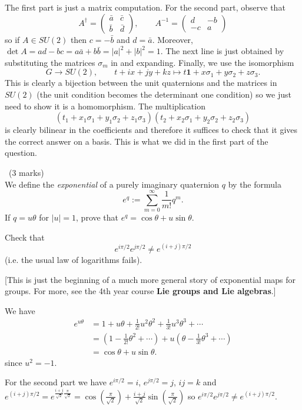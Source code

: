 \documentclass[12pt]{article}
\begin{document}
\begin{answer}
  The first part is just a matrix computation. For the second part, observe that
  \[A^{\dagger}=\left(\begin{array}{cc}\bar{a} & \bar{c}\\\bar{b} & \bar{d}\end{array}\right),\qquad A^{-1}=\left(\begin{array}{cc}d & -b\\-c & a\end{array}\right)\]
    so if $A\in SU(2)$ then $c=-\bar{b}$ and $d=\bar{a}$. Moreover, $\det A=ad-bc=a\bar{a}+b\bar{b}=|a|^2+|b|^2=1$. The next line is just obtained by substituting the matrices $\sigma_m$ in and expanding. Finally, we use the isomorphism
    \[G\to SU(2),\qquad t+ix+jy+kz\mapsto t\mathbf{1}+x\sigma_1+y\sigma_2+z\sigma_3.\]
    This is clearly a bijection between the unit quaternions and the matrices in $SU(2)$ (the unit condition becomes the determinant one condition) so we just need to show it is a homomorphism. The multiplication
    \[\left(t_1+x_1\sigma_1+y_1\sigma_2+z_1\sigma_3\right)\left(t_2+x_2\sigma_1+y_2\sigma_2+z_2\sigma_3\right)\]
    is clearly bilinear in the coefficients and therefore it suffices to check that it gives the correct answer on a basis. This is what we did in the first part of the question.
\end{answer}
\newpage

\vspace{1cm}

\begin{question}\ (3 marks)\\
  We define the {\em exponential} of a purely imaginary quaternion $q$ by the formula
  \[e^q:=\sum_{m=0}^\infty\frac{1}{m!}q^m.\]
  If $q=u\theta$ for $|u|=1$, prove that $e^q=\cos\theta+u\sin\theta$.

  Check that
  \[e^{i\pi/2}e^{j\pi/2}\neq e^{(i+j)\pi/2}\]
  (i.e. the usual law of logarithms fails).
  
  [This is just the beginning of a much more general story of exponential maps for groups. For more, see the 4th year course {\bf Lie groups and Lie algebras}.]
\end{question}

\begin{answer}
  We have
  \begin{align*}
    e^{u\theta}&=1+u\theta+\frac{1}{2!}u^2\theta^2+\frac{1}{3!}u^3\theta^3+\cdots\\
    &=\left(1-\frac{1}{2!}\theta^2+\cdots\right)+u\left(\theta-\frac{1}{3!}\theta^3+\cdots\right)\\
    &=\cos\theta+u\sin\theta.
  \end{align*}
  since $u^2=-1$.

  For the second part we have $e^{i\pi/2}=i$, $e^{j\pi/2}=j$, $ij=k$ and $e^{(i+j)\pi/2}=e^{\frac{i+j}{\sqrt{2}}\frac{\pi}{\sqrt{2}}}=\cos\left(\frac{\pi}{\sqrt{2}}\right)+\frac{i+j}{\sqrt{2}}\sin\left(\frac{\pi}{\sqrt{2}}\right)$ so $e^{i\pi/2}e^{j\pi/2}\neq e^{(i+j)\pi/2}$.
\end{answer}
\newpage
\end{document}
